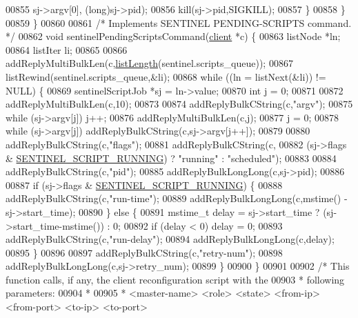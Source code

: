 \begin{DoxyCode}
{{{{{{{{{{{{{{{00855                 sj->argv[0], (\textcolor{keywordtype}{long})sj->pid);
00856             kill(sj->pid,SIGKILL);
00857         \}
00858     \}
00859 \}
00860 
00861 \textcolor{comment}{/* Implements SENTINEL PENDING-SCRIPTS command. */}
00862 \textcolor{keywordtype}{void} sentinelPendingScriptsCommand(\hyperlink{structclient}{client} *c) \{
00863     listNode *ln;
00864     listIter li;
00865 
00866     addReplyMultiBulkLen(c,\hyperlink{adlist_8h_afde0ab079f934670e82119b43120e94b}{listLength}(sentinel.scripts\_queue));
00867     listRewind(sentinel.scripts\_queue,&li);
00868     \textcolor{keywordflow}{while} ((ln = listNext(&li)) != NULL) \{
00869         sentinelScriptJob *sj = ln->value;
00870         \textcolor{keywordtype}{int} j = 0;
00871 
00872         addReplyMultiBulkLen(c,10);
00873 
00874         addReplyBulkCString(c,\textcolor{stringliteral}{"argv"});
00875         \textcolor{keywordflow}{while} (sj->argv[j]) j++;
00876         addReplyMultiBulkLen(c,j);
00877         j = 0;
00878         \textcolor{keywordflow}{while} (sj->argv[j]) addReplyBulkCString(c,sj->argv[j++]);
00879 
00880         addReplyBulkCString(c,\textcolor{stringliteral}{"flags"});
00881         addReplyBulkCString(c,
00882             (sj->flags & \hyperlink{sentinel_8c_a0211d42099c07769ec06cc0010f9b58e}{SENTINEL\_SCRIPT\_RUNNING}) ? \textcolor{stringliteral}{"running"} : \textcolor{stringliteral}{"scheduled"});
00883 
00884         addReplyBulkCString(c,\textcolor{stringliteral}{"pid"});
00885         addReplyBulkLongLong(c,sj->pid);
00886 
00887         \textcolor{keywordflow}{if} (sj->flags & \hyperlink{sentinel_8c_a0211d42099c07769ec06cc0010f9b58e}{SENTINEL\_SCRIPT\_RUNNING}) \{
00888             addReplyBulkCString(c,\textcolor{stringliteral}{"run-time"});
00889             addReplyBulkLongLong(c,mstime() - sj->start\_time);
00890         \} \textcolor{keywordflow}{else} \{
00891             mstime\_t delay = sj->start\_time ? (sj->start\_time-mstime()) : 0;
00892             \textcolor{keywordflow}{if} (delay < 0) delay = 0;
00893             addReplyBulkCString(c,\textcolor{stringliteral}{"run-delay"});
00894             addReplyBulkLongLong(c,delay);
00895         \}
00896 
00897         addReplyBulkCString(c,\textcolor{stringliteral}{"retry-num"});
00898         addReplyBulkLongLong(c,sj->retry\_num);
00899     \}
00900 \}
00901 
00902 \textcolor{comment}{/* This function calls, if any, the client reconfiguration script with the}
00903 \textcolor{comment}{ * following parameters:}
00904 \textcolor{comment}{ *}
00905 \textcolor{comment}{ * <master-name> <role> <state> <from-ip> <from-port> <to-ip> <to-port>}
}}}}}}}}}}}}}}}
\end{DoxyCode}
